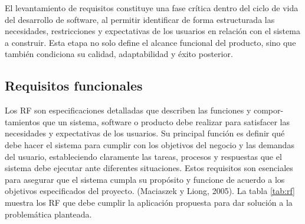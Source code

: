 El levantamiento de requisitos constituye una fase crítica dentro del ciclo de vida del desarrollo de
software, al permitir identificar de forma estructurada las necesidades, restricciones y expectativas de los
usuarios en relación con el sistema a construir. Esta etapa no solo define el alcance funcional del producto,
sino que también condiciona su calidad, adaptabilidad y éxito posterior. \citep{pressman2014se}

\subsection{Requisitos funcionales}

Los \ac{RF} son especificaciones detalladas que describen las funciones y compor-
tamientos que un sistema, software o producto debe realizar para satisfacer las necesidades y expectativas
de los usuarios. Su principal función es definir qué debe hacer el sistema para cumplir con los objetivos del
negocio y las demandas del usuario, estableciendo claramente las tareas, procesos y respuestas que el 
sistema debe ejecutar ante diferentes situaciones. Estos requisitos son esenciales para asegurar que el sistema
cumpla su propósito y funcione de acuerdo a los objetivos especificados del proyecto. (Maciaszek y Liong,
2005). La tabla \ref{tab:rf} muestra los \ac{RF} que debe cumplir la aplicación propuesta para dar
solución a la problemática planteada.

